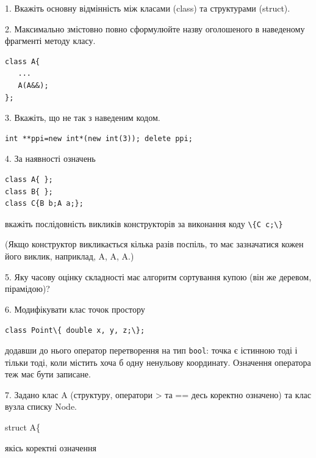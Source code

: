 \documentclass[12pt, ukrainian]{article}
\def\code#1{\Verb!#1!}
\begin{document}
{%
1. Вкажіть основну відмінність між класами (class) та структурами (struct).%
\par
\vspace{2mm}
2. Максимально змістовно повно сформулюйте назву оголошеного в наведеному фрагменті методу класу.
\vspace{-3mm}
\begin{verbatim}class A{
   ...
   A(A&&);
};\end{verbatim}
\vspace{-3mm}
\par
\vspace{2mm}
3. Вкажіть, що не так з наведеним кодом.
\vspace{-3mm}
\begin{verbatim}int **ppi=new int*(new int(3)); delete ppi;\end{verbatim}
\vspace{-3mm}
\par
\vspace{2mm}
4. За наявності означень
\vspace{-3mm}
\begin{verbatim}
class A{ };
class B{ };
class C{B b;A a;};\end{verbatim}
\vspace{-3mm}
вкажіть послідовність викликів конструкторів за виконання коду \code{\{C c;\}} 

(Якщо конструктор викликається кілька разів поспіль, то має зазначатися кожен його виклик, наприклад, A, A, A.)

\vspace{2mm}
5. Яку часову оцінку складності має алгоритм сортування купою (він же деревом, пірамідою)?
\par
\vspace{2mm}
6. Модифікувати клас точок простору 

\qquad\code{class Point\{ double x, y, z;\};}


додавши до нього оператор перетворення на тип \code{bool}: точка є істинною тоді і тільки тоді, коли містить хоча б одну ненульову координату. Означення оператора теж має бути записане.%
\par
\vspace{2mm}
7. 
Задано клас A (структуру, оператори > та == десь коректно означено) та клас вузла списку Node.

struct A\{

\quad  якісь коректні означення 

}
\end{document}
